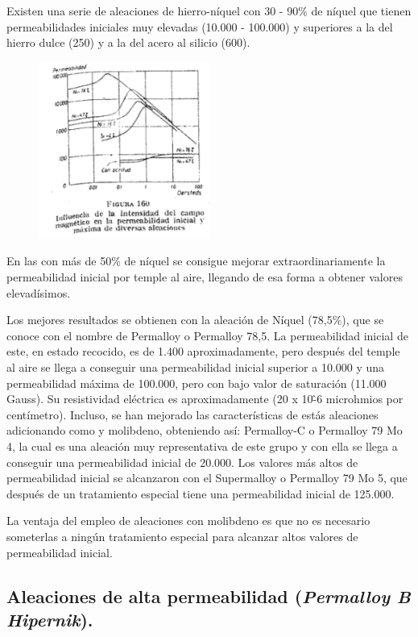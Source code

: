 \documentclass[12pt,a4paper]{article}
\begin{document}
Existen una serie de aleaciones de hierro-níquel con 30 - 90\% de níquel que tienen permeabilidades iniciales muy elevadas (10.000 - 100.000) y superiores a la del hierro dulce (250) y a la del acero al silicio (600).

\begin{figure}[H]    
    \centering         
    \includegraphics[width=0.5\textwidth]{IMAGENES LATEX/7.png}
\end{figure}

En las con más de 50\% de níquel se consigue mejorar extraordinariamente la permeabilidad inicial por temple al aire, llegando de esa forma a obtener valores elevadísimos. 

Los mejores resultados se obtienen con la aleación de Níquel (78,5\%), que se conoce con el nombre de Permalloy o Permalloy 78,5. La permeabilidad inicial de este, en estado recocido, es de 1.400 aproximadamente, pero después del temple al aire se llega a conseguir una permeabilidad inicial superior a 10.000 y una permeabilidad máxima de 100.000, pero con bajo valor de saturación (11.000 Gauss). Su resistividad eléctrica es aproximadamente (20 x 10\^-6 microhmios por centímetro). Incluso, se han mejorado las características de estás aleaciones adicionando como y molibdeno, obteniendo así: Permalloy-C o Permalloy 79 Mo 4, la cual es una aleación muy representativa de este grupo y con ella se llega a conseguir una permeabilidad inicial de 20.000. Los valores más altos de permeabilidad inicial se alcanzaron con el Supermalloy o Permalloy 79 Mo 5, que después de un tratamiento especial tiene una permeabilidad inicial de 125.000.

La ventaja del empleo de aleaciones con molibdeno es que no es necesario someterlas a ningún tratamiento especial para alcanzar altos valores de permeabilidad inicial.

\subsection{Aleaciones de alta permeabilidad (\textit{Permalloy B Hipernik}).}
\end{document}
